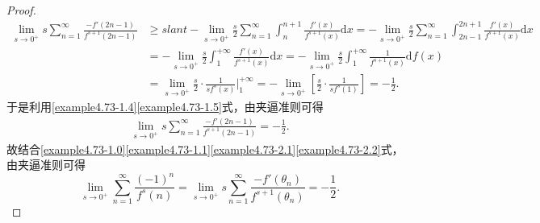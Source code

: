 \documentclass[../../main.tex]{subfiles}
\begin{document}
\begin{proof}
\begin{align}
\underset{s\rightarrow 0^+}{\lim}s\sum_{n=1}^{\infty}{\frac{-f'\left( 2n-1 \right)}{f^{s+1}\left( 2n-1 \right)}}&\geqslant slant -\underset{s\rightarrow 0^+}{\lim}\frac{s}{2}\sum_{n=1}^{\infty}{\int_n^{n+1}{\frac{f'\left( x \right)}{f^{s+1}\left( x \right)}\mathrm{d}x}}=-\underset{s\rightarrow 0^+}{\lim}\frac{s}{2}\sum_{n=1}^{\infty}{\int_{2n-1}^{2n+1}{\frac{f'\left( x \right)}{f^{s+1}\left( x \right)}\mathrm{d}x}}
\nonumber
\\
&=-\underset{s\rightarrow 0^+}{\lim}\frac{s}{2}\int_1^{+\infty}{\frac{f'\left( x \right)}{f^{s+1}\left( x \right)}\mathrm{d}x}=-\underset{s\rightarrow 0^+}{\lim}\frac{s}{2}\int_1^{+\infty}{\frac{1}{f^{s+1}\left( x \right)}\mathrm{d}f\left( x \right)}
\nonumber
\\
&=\underset{s\rightarrow 0^+}{\lim}\frac{s}{2}\cdot \frac{1}{sf^s\left( x \right)}\Big|_{1}^{+\infty}=-\underset{s\rightarrow 0^+}{\lim}\left[ \frac{s}{2}\cdot \frac{1}{sf^s\left( 1 \right)} \right] =-\frac{1}{2}.\label{example4.73-1.5}
\end{align}
于是利用\eqref{example4.73-1.4}\eqref{example4.73-1.5}式，由夹逼准则可得
\begin{align}
\lim_{s\rightarrow 0^+}s\sum_{n = 1}^{\infty}\frac{-f'(2n - 1)}{f^{s + 1}(2n - 1)} = -\frac{1}{2}. \label{example4.73-2.2} 
\end{align}
故结合\eqref{example4.73-1.0}\eqref{example4.73-1.1}\eqref{example4.73-2.1}\eqref{example4.73-2.2}式，由夹逼准则可得
\[
\lim_{s\rightarrow 0^+} \sum_{n = 1}^{\infty}\frac{(-1)^n}{f^s(n)} = \lim_{s\rightarrow 0^+} s\sum_{n = 1}^{\infty}\frac{-f'(\theta_n)}{f^{s + 1}(\theta_n)} = -\frac{1}{2}.
\]
\end{proof}
\end{document}
